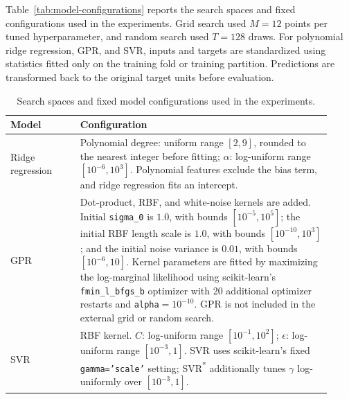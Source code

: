 Table~\ref{tab:model-configurations} reports the search spaces and fixed configurations used in the experiments. Grid search used \(M=12\) points per tuned hyperparameter, and random search used \(T=128\) draws.
For polynomial ridge regression, GPR, and SVR, inputs and targets are standardized using statistics fitted only on the training fold or training partition.
Predictions are transformed back to the original target units before evaluation.

\begin{table}[H]
	\centering
	\caption{Search spaces and fixed model configurations used in the experiments.}
	\small
	\begin{tabular}{p{0.20\linewidth}p{0.72\linewidth}}
		\toprule
		Model                            & Configuration                                                                                                                                                                                                                                                                                                                                                                                                                                            \\
		\midrule
		Ridge regression                 & Polynomial degree: uniform range \([2,9]\), rounded to the nearest integer before fitting; \(\alpha\): log-uniform range \([10^{-6},10^{3}]\). Polynomial features exclude the bias term, and ridge regression fits an intercept.                                                                                                                                                                                                                                                     \\
		GPR                              & Dot-product, RBF, and white-noise kernels are added. Initial \texttt{sigma\_0} is \(1.0\), with bounds \([10^{-5},10^{5}]\); the initial RBF length scale is \(1.0\), with bounds \([10^{-10},10^{3}]\); and the initial noise variance is \(0.01\), with bounds \([10^{-6},10]\). Kernel parameters are fitted by maximizing the log-marginal likelihood using scikit-learn's \texttt{fmin\_l\_bfgs\_b} optimizer with 20 additional optimizer restarts and \texttt{alpha}\(=10^{-10}\). GPR is not included in the external grid or random search. \\
		SVR                              & RBF kernel. \(C\): log-uniform range \([10^{-1},10^{2}]\); \(\epsilon\): log-uniform range \([10^{-3},1]\). SVR uses scikit-learn's fixed \texttt{gamma='scale'} setting; SVR\textsuperscript{*} additionally tunes \(\gamma\) log-uniformly over \([10^{-3},1]\).                                                                                                                                                                                       \\

\end{tabular}
\end{table}
